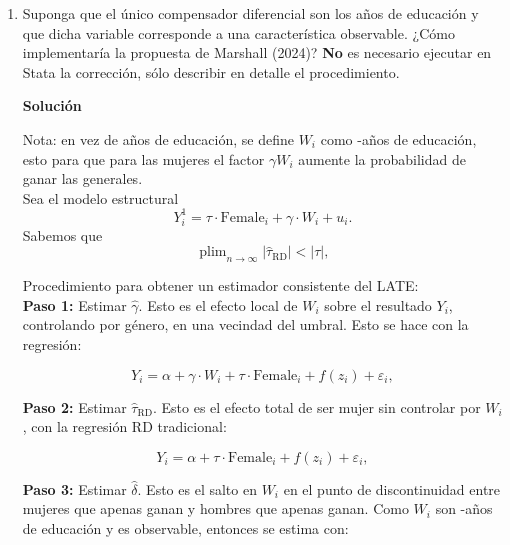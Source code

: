 \documentclass[a4paper, answers, addpoints, 11pt]{exam}
\DeclareMathOperator*{\plim}{plim}
\newenvironment{solucion}{%
  \begin{mdframed}[
    backgroundcolor=blue!5,    %
    linecolor=blue!50,          %
    linewidth=2pt,              %
    leftmargin=10pt,            %
    rightmargin=8pt,           %
    topline=true,              %
    bottomline=true,            %
    roundcorner=10pt,           %
    innerleftmargin=10pt,       %
    innerrightmargin=10pt,      %
    innerbottommargin=10pt,     %
    innertopmargin=10pt         %
  ]%
  \begin{tcolorbox}[colframe=blue!50!black, colback=blue!50, coltitle=white, sharp corners=all, boxrule=1mm, width=\textwidth, halign=left, valign=center, top=0mm, bottom=0mm, left=0mm, right=0mm] \textbf{Solución} \end{tcolorbox} }{\end{mdframed}}
\begin{document}
\begin{enumerate}[resume]
\item Suponga que el único compensador diferencial son los años de educación y que dicha variable corresponde a una característica observable. ¿Cómo implementaría la propuesta de Marshall (2024)? \textbf{No} es necesario ejecutar en Stata la corrección, sólo describir en detalle el procedimiento.
    


\begin{solucion}
Nota: en vez de años de educación, se define $W_i$ como -años de educación, esto para que para las mujeres el factor $\gamma W_i$ aumente la probabilidad de ganar las generales.\\



Sea el modelo estructural
\[
Y_i^1 = \tau \cdot \text{Female}_i + \gamma \cdot W_i + u_i.
\]
Sabemos que 
\[
\plim_{n \to \infty} |\hat{\tau}_{\text{RD}}| < |\tau|,
\]
 
Procedimiento para obtener un estimador consistente del LATE:\\

\textbf{Paso 1:} Estimar $\hat{\gamma}$. Esto es el efecto local de \( W_i \) sobre el resultado \( Y_i \), controlando por género, en una vecindad del umbral. Esto se hace con la regresión:

\[
Y_i = \alpha + \gamma \cdot W_i + \tau \cdot \text{Female}_i + f(z_i) + \varepsilon_i,
\]


\vspace{0.3cm}
\textbf{Paso 2:} Estimar \( \hat{\tau}_{\text{RD}} \). Esto es el efecto total de ser mujer sin controlar por \( W_i \), con la regresión RD tradicional:

\[
Y_i = \alpha + \tau \cdot \text{Female}_i + f(z_i) + \varepsilon_i,
\]


\vspace{0.3cm}
\textbf{Paso 3:} Estimar $\hat{\delta}$. Esto es el salto en \( W_i \) en el punto de discontinuidad entre mujeres que apenas ganan y hombres que apenas ganan. Como $W_i$ son -años de educación y es observable, entonces se estima con:


\end{solucion}
\end{enumerate}
\end{document}
